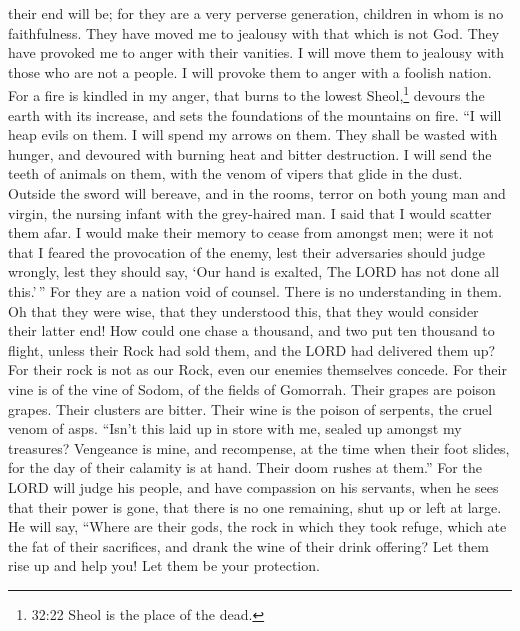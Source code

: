 their end will be; for they are a very perverse generation, children in
whom is no faithfulness.  They have moved me to jealousy
with that which is not God. They have provoked me to anger with their
vanities. I will move them to jealousy with those who are not a people.
I will provoke them to anger with a foolish nation.  For a
fire is kindled in my anger, that burns to the lowest Sheol,\footnote{32:22
  Sheol is the place of the dead.} devours the earth with its increase,
and sets the foundations of the mountains on fire.  ``I
will heap evils on them. I will spend my arrows on them. 
They shall be wasted with hunger, and devoured with burning heat and
bitter destruction. I will send the teeth of animals on them, with the
venom of vipers that glide in the dust.  Outside the sword
will bereave, and in the rooms, terror on both young man and virgin, the
nursing infant with the grey-haired man.  I said that I
would scatter them afar. I would make their memory to cease from amongst
men;  were it not that I feared the provocation of the
enemy, lest their adversaries should judge wrongly, lest they should
say, `Our hand is exalted, The LORD has not done all this.'\,''
 For they are a nation void of counsel. There is no
understanding in them.  Oh that they were wise, that they
understood this, that they would consider their latter end!
 How could one chase a thousand, and two put ten thousand
to flight, unless their Rock had sold them, and the LORD had delivered
them up?  For their rock is not as our Rock, even our
enemies themselves concede.  For their vine is of the vine
of Sodom, of the fields of Gomorrah. Their grapes are poison grapes.
Their clusters are bitter.  Their wine is the poison of
serpents, the cruel venom of asps.  ``Isn't this laid up in
store with me, sealed up amongst my treasures?  Vengeance
is mine, and recompense, at the time when their foot slides, for the day
of their calamity is at hand. Their doom rushes at them.'' 
For the LORD will judge his people, and have compassion on his servants,
when he sees that their power is gone, that there is no one remaining,
shut up or left at large.  He will say, ``Where are their
gods, the rock in which they took refuge,  which ate the
fat of their sacrifices, and drank the wine of their drink offering? Let
them rise up and help you! Let them be your protection. 

